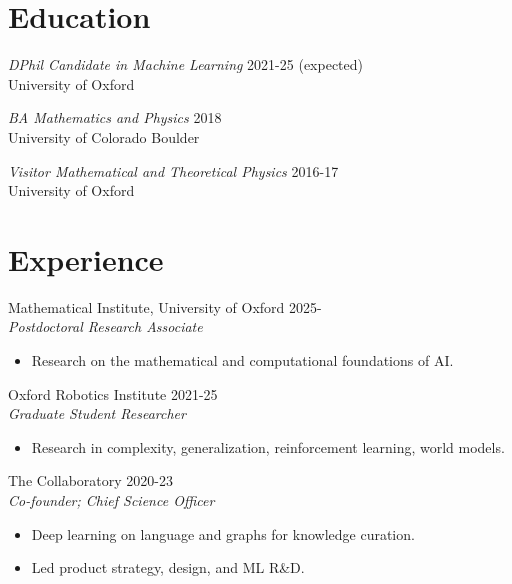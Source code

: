 \documentclass[margin]{res}
\begin{document}
\begin{resume}


    \section{Education} {\sl DPhil Candidate in Machine Learning} \hfill 2021-25 (expected)\\
                University of Oxford

  {\sl BA Mathematics and Physics} \hfill 2018\\
  University of Colorado Boulder

  {\sl Visitor Mathematical and Theoretical Physics} \hfill 2016-17\\
  University of Oxford

  \section{Experience}
  Mathematical Institute, University of Oxford \hfill 2025-\\
                 {\sl Postdoctoral Research Associate}
                 \begin{itemize}  \itemsep -2pt %
                 \item Research on the mathematical and computational foundations of AI.
                 \end{itemize}

  Oxford Robotics Institute \hfill 2021-25\\
                 {\sl Graduate Student Researcher}
                 \begin{itemize}  \itemsep -2pt %
                 \item Research in complexity, generalization, reinforcement learning, world models.
                 \end{itemize}

                The Collaboratory \hfill 2020-23 \\
                 {\sl Co-founder; Chief Science Officer}
                 \begin{itemize}  \itemsep -2pt %
                 \item Deep learning on language and graphs for knowledge curation.
                 \item Led product strategy, design, and ML R\&D.
                 \end{itemize}


\end{resume}
\end{document}
